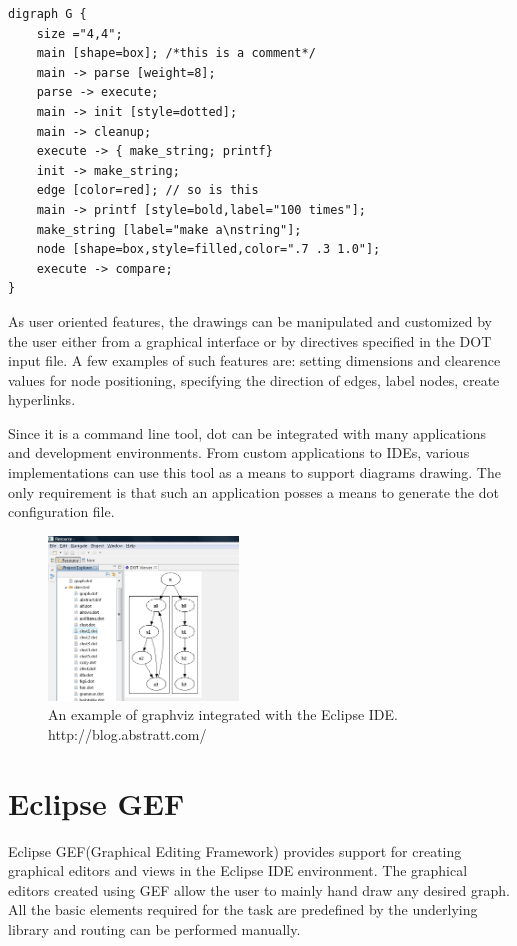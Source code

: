 \begin{lstlisting}[caption={Customized graph dot file representation}]
digraph G {
	size ="4,4";
	main [shape=box]; /*this is a comment*/
	main -> parse [weight=8];
	parse -> execute;
	main -> init [style=dotted];
	main -> cleanup;
	execute -> { make_string; printf}
	init -> make_string;
	edge [color=red]; // so is this
	main -> printf [style=bold,label="100 times"];
	make_string [label="make a\nstring"];
	node [shape=box,style=filled,color=".7 .3 1.0"];
	execute -> compare;
}
\end{lstlisting}

As user oriented features, the drawings can be manipulated and customized by the user either from a graphical 
interface or by directives specified in the DOT input file. A few examples of such features are: setting dimensions 
and clearence values for node positioning, specifying the direction of edges, label nodes, create hyperlinks.

Since it is a command line tool, dot can be integrated with many applications and development environments. From 
custom applications to IDEs, various implementations can use this tool as a means to support diagrams drawing. The 
only requirement is that such an application posses a means to generate the dot configuration file.

\begin{figure}[ht] \centering
\includegraphics[width=0.45\textwidth]{img/relatedwork/graphviz.png}
\caption{An example of graphviz integrated with the Eclipse IDE. http://blog.abstratt.com/} \end{figure}

\section{Eclipse GEF}

Eclipse GEF(Graphical Editing Framework) provides support for creating graphical editors and views in the Eclipse IDE environment. The graphical 
editors created using GEF allow the user to mainly hand draw any desired graph. All the basic elements required for the task are predefined 
by the underlying library and routing can be performed manually.

